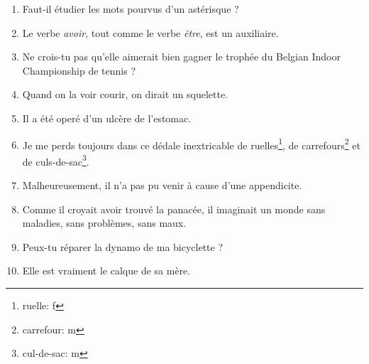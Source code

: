 \documentclass[11pt, french]{report}
\begin{document}
\begin{enumerate}
  \item Faut-il étudier les mots pourvus d'un astérisque ?
  \item Le verbe \textit{avoir}, tout comme le verbe \textit{être}, est un auxiliaire.
  \item Ne crois-tu pas qu'elle aimerait bien gagner le trophée du Belgian Indoor Championship de tennis ?
  \item Quand on la voir courir, on dirait un squelette.
  \item Il a été operé d'un ulcère de l'estomac.
  \item Je me perds toujours dans ce dédale inextricable de ruelles\footnote{ruelle: f}, de carrefours\footnote{carrefour: m} et de culs-de-sac\footnote{cul-de-sac: m}.
  \item Malheureusement, il n'a pas pu venir à cause d'une appendicite.
  \item Comme il croyait avoir trouvé la panacée, il imaginait un monde sans maladies, sans problèmes, sans maux.
  \item Peux-tu réparer la dynamo de ma bicyclette ?
  \item Elle est vraiment le calque de sa mère.
\end{enumerate}
\end{document}
